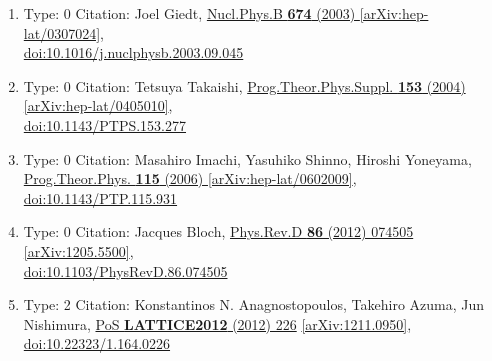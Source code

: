 \documentclass[a4paper,10pt]{article}
\begin{document}
\begin{enumerate}
\begin{enumerate}
  \item Type: 0 Citation: Joel Giedt, \href{https://www.doi.org/10.1016/j.nuclphysb.2003.09.045}{Nucl.Phys.B {\bf 674} (2003) }  \href{https://arxiv.org/abs/hep-lat/0307024}{[arXiv:hep-lat/0307024]},\\\href{https://www.doi.org/10.1016/j.nuclphysb.2003.09.045}{doi:10.1016/j.nuclphysb.2003.09.045}
  \item Type: 0 Citation: Tetsuya Takaishi, \href{https://www.doi.org/10.1143/PTPS.153.277}{Prog.Theor.Phys.Suppl. {\bf 153} (2004) }  \href{https://arxiv.org/abs/hep-lat/0405010}{[arXiv:hep-lat/0405010]},\\\href{https://www.doi.org/10.1143/PTPS.153.277}{doi:10.1143/PTPS.153.277}
  \item Type: 0 Citation: Masahiro Imachi, Yasuhiko Shinno, Hiroshi Yoneyama, \href{https://www.doi.org/10.1143/PTP.115.931}{Prog.Theor.Phys. {\bf 115} (2006) }  \href{https://arxiv.org/abs/hep-lat/0602009}{[arXiv:hep-lat/0602009]},\\\href{https://www.doi.org/10.1143/PTP.115.931}{doi:10.1143/PTP.115.931}
  \item Type: 0 Citation: Jacques Bloch, \href{https://www.doi.org/10.1103/PhysRevD.86.074505}{Phys.Rev.D {\bf 86} (2012) 074505}  \href{https://arxiv.org/abs/1205.5500}{[arXiv:1205.5500]},\\\href{https://www.doi.org/10.1103/PhysRevD.86.074505}{doi:10.1103/PhysRevD.86.074505}
  \item Type: 2 Citation: Konstantinos N. Anagnostopoulos, Takehiro Azuma, Jun Nishimura, \href{https://www.doi.org/10.22323/1.164.0226}{PoS {\bf LATTICE2012} (2012) 226}  \href{https://arxiv.org/abs/1211.0950}{[arXiv:1211.0950]},\\\href{https://www.doi.org/10.22323/1.164.0226}{doi:10.22323/1.164.0226}

\end{enumerate}
\end{enumerate}
\end{document}

